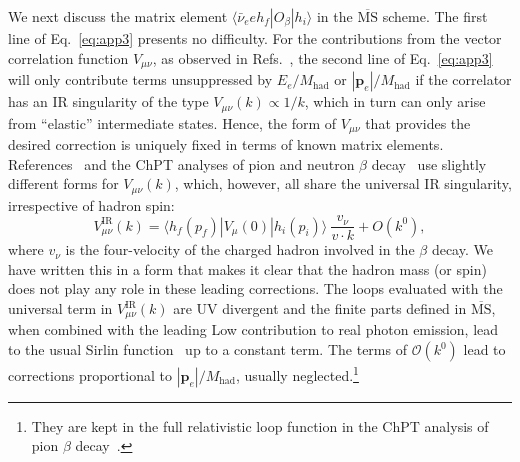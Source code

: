 \documentclass[prl,twocolumn,twoside,preprintnumbers,superscriptaddress,nofootinbib,letterpaper]{revtex4-1}
\newcommand{\Order}{\mathcal{O}}
\newcommand{\beq}{\begin{equation}}
\newcommand{\eeq}{\end{equation}}
\newcommand{\Mhad}{M_\text{had}}
\begin{document}
We next  discuss the  matrix element  $\langle \bar \nu_e e  h_f  | O_\beta  | h_i \rangle$
in the  $\overline{\text{MS}}$  scheme.
The first line of Eq.~\eqref{eq:app3} presents no difficulty.
For the contributions from the vector correlation function $V_{\mu \nu}$,
as observed in Refs.~\cite{Abers:1968zz,Sirlin:1977sv},  the second line of Eq.~\eqref{eq:app3} will only contribute terms unsuppressed by
$E_e/\Mhad$  or $|\mathbf{p}_e|/\Mhad$ if  the correlator  has an IR singularity of the type $V_{\mu \nu} (k)  \propto 1/k$, which in turn can only arise from ``elastic'' intermediate
states.   Hence, the form of $V_{\mu \nu}$ that provides the desired correction is uniquely fixed  in terms of known matrix elements.
References~\cite{Abers:1968zz, Sirlin:1977sv}  and the ChPT analyses of pion and neutron $\beta$ decay~\cite{Cirigliano:2002ng,Cirigliano:2022hob}
use slightly different forms for $V_{\mu \nu}(k)$, which, however, all share
the universal  IR singularity, irrespective of hadron spin:
\beq
V^\text{IR}_{\mu \nu} (k)
 =    \langle h_f (p_f) | V_\mu (0) | h_i (p_i) \rangle \ \frac{v_\nu}{ v \cdot k}  +  O(k^0),
\eeq
where $v_\nu$ is the four-velocity of the charged hadron involved in the $\beta$ decay.
We have written this in a form that makes it clear that the hadron mass  (or spin) does not play any role in these  leading corrections.
The loops evaluated with the universal term in $V^\text{IR}_{\mu \nu} (k)$ are UV divergent and the finite parts
defined in  $\overline{\text{MS}}$,
 when combined with the leading Low contribution to real photon
emission, lead to the usual Sirlin function~\cite{Sirlin:1967zza} up to a constant term.
The terms  of  $\Order(k^0)$  lead to corrections proportional to $|\mathbf{p}_e|/\Mhad$, usually neglected.\footnote{They are kept in the full  relativistic loop
function in the ChPT analysis of pion $\beta$ decay~\cite{Cirigliano:2002ng}.}
\end{document}
